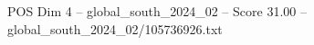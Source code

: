 \begin{textsample}{POS Dim 4 – global\_south\_2024\_02 – Score 31.00 – global\_south\_2024\_02/105736926.txt}
\end{textsample}
